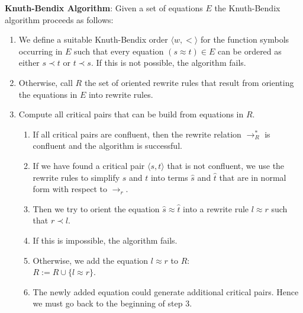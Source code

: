 \noindent
\textbf{Knuth-Bendix Algorithm}:  Given a set of equations $E$ the Knuth-Bendix algorithm proceeds as follows:
\begin{enumerate}
\item We define a suitable Knuth-Bendix order $\langle w, < \rangle$ for the function symbols occurring in $E$
      such that every equation  $(s \approx t) \in E$ can be ordered as either $s \prec t$ or $t \prec s$.
      If this is not possible, the algorithm fails.
\item Otherwise, call $R$ the set of oriented rewrite rules that result from orienting the equations in $E$
      into rewrite rules.
\item Compute all critical pairs that can be build from equations in $R$.
      \begin{enumerate}
      \item If all critical pairs are confluent, then the rewrite relation $\rightarrow^*_R$ is confluent
            and the algorithm is successful.
      \item If we have found a critical pair $\langle s, t \rangle$ that is not confluent, we use the rewrite
            rules to simplify $s$ and $t$ into terms $\widehat{s}$ and $\widehat{t}$ that are in normal form
            with respect to $\rightarrow_r$.
      \item Then we try to orient the equation $\widehat{s} \approx \widehat{t}$ into a rewrite rule
            $l \approx r$ such that $r \prec l$.
      \item If this is impossible, the algorithm fails.
      \item Otherwise, we add the equation $l \approx r$ to $R$:
            \\[0.2cm]
            \hspace*{1.3cm}
            $R := R \cup \{ l \approx r \}$.
      \item The newly added equation could generate additional critical pairs.
            Hence we must go back to the beginning of step 3. \eod
      \end{enumerate}
\end{enumerate}


